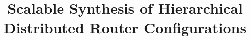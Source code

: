 \documentclass[10pt,numbers,preprint,nocopyrightspace]{sigplanconf}
\begin{document}
%



\title{Scalable Synthesis of Hierarchical Distributed Router Configurations\vspace{-.7in}}

\authorinfo{~}
{~}
{~}

\maketitle












%
%


%





\end{document}
